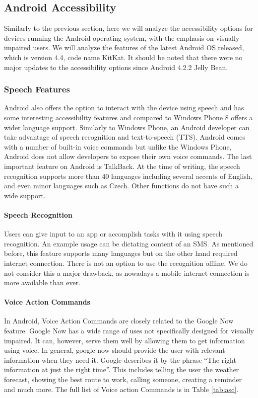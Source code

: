 \subsection{Android Accessibility}
Similarly to the previous section, here we will analyze the accessibility options for devices running the Android operating system, with the emphasis on visually impaired users. We will analyze the features of the latest Android OS released, which is version 4.4, code name KitKat. It should be noted that there were no major updates to the accessibility options since Android 4.2.2 Jelly Bean.
\subsubsection{Speech Features}
Android also offers the option to interact with the device using speech and has some interesting accessibility features and compared to Windows Phone 8 offers a wider language support. Similarly to Windows Phone, an Android developer can take advantage of speech recognition and text-to-speech (TTS). Android comes with a number of built-in voice commands but unlike the Windows Phone, Android does not allow developers to expose their own voice commands. The last important feature on Android is TalkBack.
At the time of writing, the speech recognition supports more than 40 languages including several accents of English, and even minor languages such as Czech. Other functions do not have such a wide support. 
\paragraph{Speech Recognition}
Users can give input to an app or accomplish tasks with it using speech recognition. An example usage can be dictating content of an SMS. As mentioned before, this feature supports many languages but on the other hand required internet connection. There is not an option to use the recognition offline. We do not consider this a major drawback, as nowadays a mobile internet connection is more available than ever.
\paragraph{Voice Action Commands}
In Android, Voice Action Commands are closely related to the Google Now feature. Google Now has a wide range of uses not specifically designed for visually impaired. It can, however, serve them well by allowing them to get information using voice.
In general, google now should provide the user with relevant information when they need it. Google describes it by the phrase “The right information at just the right time”. This includes telling the user the weather forecast, showing the best route to work, calling someone, creating a reminder and much more. The full list of Voice action Commands is in Table \ref{tab:asc}.


